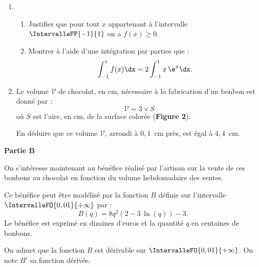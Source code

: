 \begin{enumerate}
	\item 
	\begin{enumerate}
		\item Justifier que pour tout $x$ appartenant à l'intervalle $\IntervalleFF{-1}{1}$ on a $f(x) \geqslant 0$.
		\item Montrer à l'aide d'une intégration par parties que : \[ \int_{-1}^1 f(x) \dx = 2 \int_{-1}^1 x\,\e^{x} \dx. \]
	\end{enumerate}
	\item Le volume $\mathcal{V}$ de chocolat, en cm, nécessaire à la fabrication d'un bonbon est donné par : \[ \mathcal{V} = 3 \times S \]%
	où $S$ est l'aire, en cm, de la surface colorée (\textsf{\textbf{Figure 2}}).
	
	En déduire que ce volume $\mathcal{V}$, arrondi à $0,1$~cm près, est égal à $4,4$~cm.
\end{enumerate}

\begin{Centrage}
	\textbf{Partie B}
\end{Centrage}

On s'intéresse maintenant au bénéfice réalisé par l'artisan sur la vente de ces bonbons au chocolat en fonction du volume hebdomadaire des ventes.

\smallskip

Ce bénéfice peut être modélisé par la fonction $B$ définie sur l'intervalle $\IntervalleFO{0,01}{+\infty}$ par : \[ B(q)=8q^2(2-3\,\ln(q))-3. \]
%
Le bénéfice est exprimé en dizaines d'euros et la quantité $q$ en centaines de bonbons.

\medskip

On admet que la fonction $B$ est dérivable sur $\IntervalleFO{0,01}{+\infty}$. On note $B'$ sa fonction dérivée. 

